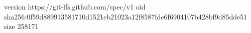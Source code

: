 version https://git-lfs.github.com/spec/v1
oid sha256:0f59d889913581710d1521eb21023a12f8587fde6f6904107b428bf9d85dde51
size 258171
